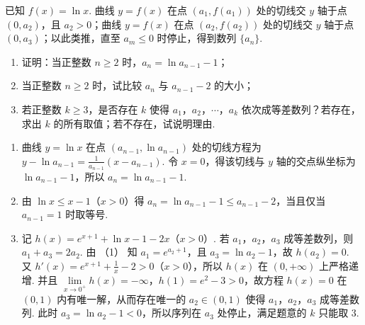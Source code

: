 \begin{problem}
已知 \(f(x)=\ln x\). 曲线 \(y=f(x)\) 在点 \(\left(a_1,f(a_1)\right)\) 处的切线交 \(y\) 轴于点 \((0,a_2)\)，且 \(a_2>0\)；曲线 \(y=f(x)\) 在点 \(\left(a_2,f(a_2)\right)\) 处的切线交 \(y\) 轴于点 \((0,a_3)\)；以此类推，直至 \(a_m\le 0\) 时停止，得到数列 \(\{a_n\}\).
\begin{enumerate}
\item 证明：当正整数 \(n\ge 2\) 时，\(a_n=\ln a_{n-1}-1\)；
\item 当正整数 \(n\ge 2\) 时，试比较 \(a_n\) 与 \(a_{n-1}-2\) 的大小；
\item 若正整数 \(k\ge 3\)，是否存在 \(k\) 使得 \(a_1\)，\(a_2\)，\(\cdots\)，\(a_k\) 依次成等差数列？若存在，求出 \(k\) 的所有取值；若不存在，试说明理由.
\end{enumerate}
\end{problem}

\begin{solution}
\begin{enumerate}
\item 曲线 \(y=\ln x\) 在点 \(\left(a_{n-1},\ln a_{n-1}\right)\) 处的切线方程为 \(y-\ln a_{n-1}=\frac1{a_{n-1}}\left(x-a_{n-1}\right)\). 令 \(x=0\)，得该切线与 \(y\) 轴的交点纵坐标为 \(\ln a_{n-1}-1\)，所以 \(a_n=\ln a_{n-1}-1\).

\item 由 \(\ln x\le x-1\)（\(x>0\)）得 \(a_n=\ln a_{n-1}-1\le a_{n-1}-2\)，当且仅当 \(a_{n-1}=1\) 时取等号.

\item 记 \(h(x)=e^{x+1}+\ln x-1-2x\)（\(x>0\)）. 若 \(a_1\)，\(a_2\)，\(a_3\) 成等差数列，则 \(a_1+a_3=2a_2\). 由 （1） 知 \(a_1=e^{a_2+1}\)，且 \(a_3=\ln a_2-1\)，故 \(h(a_2)=0\). 又 \(h'(x)=e^{x+1}+\frac1x-2>0\)（\(x>0\)），所以 \(h(x)\) 在 \((0,+\infty)\) 上严格递增. 并且 \(\lim\limits_{x\to 0^+}h(x)=-\infty\)，\(h(1)=e^2-3>0\)，故方程 \(h(x)=0\) 在 \((0,1)\) 内有唯一解，从而存在唯一的 \(a_2\in(0,1)\) 使得 \(a_1\)，\(a_2\)，\(a_3\) 成等差数列. 此时 \(a_3=\ln a_2-1<0\)，所以序列在 \(a_3\) 处停止，满足题意的 \(k\) 只能取 \(3\).
\end{enumerate}
\end{solution}
